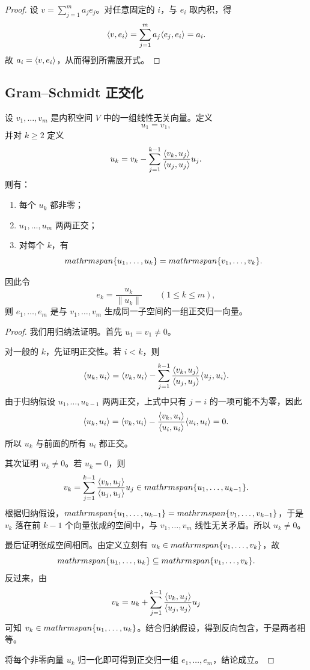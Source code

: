 \begin{proof}
设 $v=\sum_{j=1}^m a_je_j$。对任意固定的 $i$，与 $e_i$ 取内积，得
\[
\langle v, e_i \rangle=\sum_{j=1}^m a_j\langle e_j, e_i \rangle=a_i.
\]
故 $a_i=\langle v, e_i \rangle$，从而得到所需展开式。
\end{proof}

\subsection{Gram--Schmidt 正交化}

\begin{theorem}
设 $v_1,\dots,v_m$ 是内积空间 $V$ 中的一组线性无关向量。定义
\[
u_1=v_1,
\]
并对 $k\ge 2$ 定义
\[
u_k=v_k-\sum_{j=1}^{k-1}\frac{\langle v_k, u_j \rangle}{\langle u_j, u_j \rangle}u_j.
\]
则有：
\begin{enumerate}[label=\textnormal{(\arabic*)}]
  \item 每个 $u_k$ 都非零；
  \item $u_1,\dots,u_m$ 两两正交；
  \item 对每个 $k$，有
  \[
  \\mathrm{span}\{u_1,\dots,u_k\}=\\mathrm{span}\{v_1,\dots,v_k\}.
  \]
\end{enumerate}
因此令
\[
e_k=\frac{u_k}{\|u_k\|}\qquad (1\le k\le m),
\]
则 $e_1,\dots,e_m$ 是与 $v_1,\dots,v_m$ 生成同一子空间的一组正交归一向量。
\end{theorem}

\begin{proof}
我们用归纳法证明。首先 $u_1=v_1\ne 0$。

对一般的 $k$，先证明正交性。若 $i<k$，则
\[
\langle u_k, u_i \rangle
=\langle v_k, u_i \rangle-\sum_{j=1}^{k-1}\frac{\langle v_k, u_j \rangle}{\langle u_j, u_j \rangle}\langle u_j, u_i \rangle.
\]
由于归纳假设 $u_1,\dots,u_{k-1}$ 两两正交，上式中只有 $j=i$ 的一项可能不为零，因此
\[
\langle u_k, u_i \rangle=\langle v_k, u_i \rangle-\frac{\langle v_k, u_i \rangle}{\langle u_i, u_i \rangle}\langle u_i, u_i \rangle=0.
\]
所以 $u_k$ 与前面的所有 $u_i$ 都正交。

其次证明 $u_k\ne 0$。若 $u_k=0$，则
\[
v_k=\sum_{j=1}^{k-1}\frac{\langle v_k, u_j \rangle}{\langle u_j, u_j \rangle}u_j\in \\mathrm{span}\{u_1,\dots,u_{k-1}\}.
\]
根据归纳假设，$\\mathrm{span}\{u_1,\dots,u_{k-1}\}=\\mathrm{span}\{v_1,\dots,v_{k-1}\}$，于是 $v_k$ 落在前 $k-1$ 个向量张成的空间中，与 $v_1,\dots,v_m$ 线性无关矛盾。所以 $u_k\ne 0$。

最后证明张成空间相同。由定义立刻有 $u_k\in \\mathrm{span}\{v_1,\dots,v_k\}$，故
\[
\\mathrm{span}\{u_1,\dots,u_k\}\subseteq \\mathrm{span}\{v_1,\dots,v_k\}.
\]
反过来，由
\[
v_k=u_k+\sum_{j=1}^{k-1}\frac{\langle v_k, u_j \rangle}{\langle u_j, u_j \rangle}u_j
\]
可知 $v_k\in \\mathrm{span}\{u_1,\dots,u_k\}$。结合归纳假设，得到反向包含，于是两者相等。

将每个非零向量 $u_k$ 归一化即可得到正交归一组 $e_1,\dots,e_m$，结论成立。
\end{proof}

